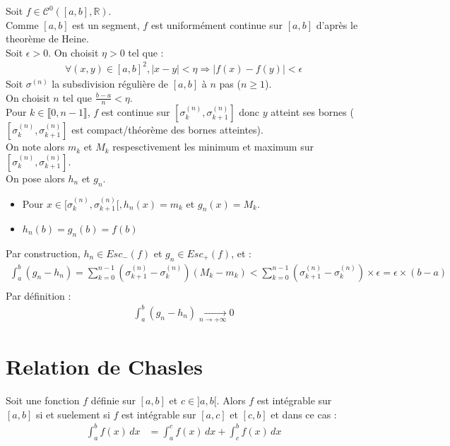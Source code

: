 \documentclass[../main.tex]{subfiles}
\begin{document}
\noindent Soit $f\in \mathcal{C}^0([a, b], \mathbb{R})$. \\
Comme $[a, b]$ est un segment, $f$ est uniformément continue sur $[a, b]$ d'après le theorème de Heine. \\
Soit $\epsilon > 0$. On choisit $\eta > 0$ tel que : 
\begin{align*}
    \forall (x, y) \in [a, b]^2, |x - y| < \eta \Rightarrow |f(x) - f(y)| < \epsilon
\end{align*}
Soit $\sigma^{(n)}$ la subsdivision régulière de $[a, b]$ à $n$ pas ($n \geq 1$). \\
On choisit $n$ tel que $\frac{b-a}{n} < \eta$. \\
Pour $k\in \llbracket 0, n-1 \rrbracket$, $f$ est continue sur $[\sigma_k^{(n)}, \sigma_{k+1}^{(n)}]$ donc $y$ atteint ses bornes ($[\sigma_k^{(n)}, \sigma_{k+1}^{(n)}]$ est compact/théorème des bornes atteintes). \\
On note alors $m_k$ et $M_k$ respesctivement les minimum et maximum sur $[\sigma_k^{(n)}, \sigma_{k+1}^{(n)}]$. \\
On pose alors $h_n$ et $g_n$. \\
\begin{itemize}
    \item Pour $x\in [\sigma_k^{(n)}, \sigma_{k+1}^{(n)}[, h_n(x) = m_k$ et $g_n(x) = M_k$. \\
    \item $h_n(b) = g_n(b) = f(b)$
\end{itemize}
Par construction, $h_n \in Esc_-(f)$ et $g_n \in Esc_+(f)$, et : 
\begin{align*}
    \int_{a}^{b} (g_n - h_n) = \sum_{k=0}^{n-1} (\sigma_{k+1}^{(n)} - \sigma_k^{(n)}) (M_k - m_k) < \sum_{k=0}^{n-1} (\sigma_{k+1}^{(n)} - \sigma_k^{(n)}) \times \epsilon = \epsilon \times (b - a) \\
\end{align*}
Par définition : 
\begin{align*}
    \int_{a}^{b} (g_n - h_n)  \underset{n \to +\infty}{\longrightarrow} 0
\end{align*}

\section{Relation de Chasles}
\begin{tcolorbox}[title=Propostion 26.46, title filled=false, colframe=lightblue, colback=lightblue!10!white]
    Soit une fonction $f$ définie sur $[a, b]$ et $c\in ]a, b[$. Alors $f$ est intégrable sur $[a, b]$ si et suelement si $f$ est intégrable sur $[a, c]$ et $[c, b]$ et dans ce cas : 
    \begin{align*}
        \int_{a}^{b} f(x) \,dx &= \int_{a}^{c} f(x) \,dx + \int_{c}^{b} f(x) \,dx
    \end{align*}
\end{tcolorbox}
\end{document}
